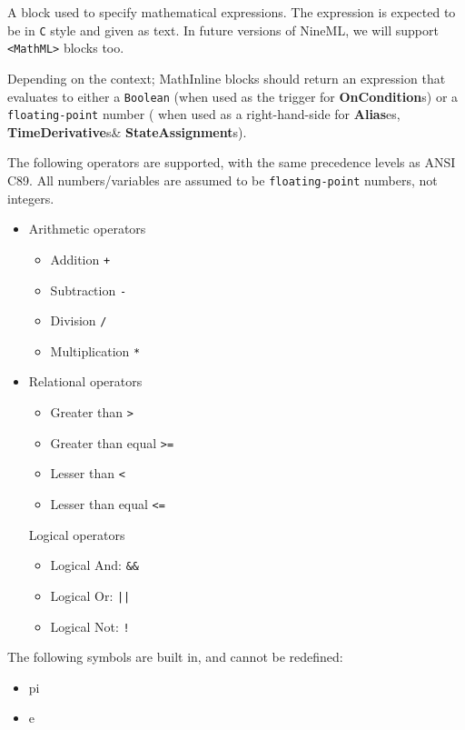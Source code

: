 \documentclass{article}
\newcommand{\StateAssignments}{{\bf{StateAssignment}}s\xspace}
\newcommand{\TimeDerivatives}{{\bf{TimeDerivative}}s\xspace}
\newcommand{\Aliases}{{\bf{Alias}}es\xspace}
\newcommand{\OnConditions}{{\bf{OnCondition}}s\xspace}
\begin{document}
A block used to specify mathematical expressions. The expression is expected to
be in \texttt{C} style and given as text. In future versions of NineML, we will
support \verb|<MathML>| blocks too.

Depending on the context; MathInline blocks should return an expression that
evaluates to either a \verb|Boolean| (when used as the trigger for
\OnConditions) or a \verb|floating-point| number ( when used  as a
right-hand-side for  \Aliases, \TimeDerivatives \& \StateAssignments).

The following operators are supported, with the same precedence levels as ANSI
C89. All
numbers/variables are assumed to be \verb|floating-point| numbers, not integers.

\begin{itemize}
\item Arithmetic operators
\begin{itemize}
\item Addition \verb|+|
\item Subtraction \verb|-|
\item Division \verb|/|
\item Multiplication \verb|*|
\end{itemize}

\item Relational operators
\begin{itemize}
\item Greater than \verb|>|
\item Greater than equal \verb|>=|
\item Lesser than \verb|<|
\item Lesser than equal \verb|<=|
\end{itemize}

Logical operators
\begin{itemize}
\item Logical And: \verb|&&|
\item Logical Or:  \verb+||+
\item Logical Not: \verb|!|
\end{itemize}

\end{itemize}

The following symbols are built in, and cannot be redefined:
\begin{itemize}
\item pi
\item e
\end{itemize}
\end{document}
